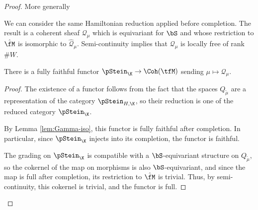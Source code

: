 \begin{proof}
More generally

We can consider the same Hamiltonian reduction applied before completion.  The result is a coherent sheaf ${\mathcal{Q}}_\mu$ which is equivariant for $\bS$ and whose restriction to $\hat{\fM}$ is isomorphic to $\hat{\mathcal{Q}}_\mu$.  Semi-continuity implies that ${\mathcal{Q}}_\mu$ is locally free of rank $\#W$.

\begin{lemma}\label{lem:pStein-fully-faithful}
  There is a fully faithful functor $\pStein_\K\to \Coh(\tfM)$ sending $\mu\mapsto {\mathcal{Q}}_\mu$.  
\end{lemma}
\begin{proof}
  The existence of a functor follows from the fact that the spaces ${Q}_{\tilde{\mu}}$ are a representation of the category ${\pStein}_{H,\K}$, so their reduction is one of the reduced category ${\pStein}_{\K}$.  
  
  By Lemma \ref{lem:Gamma-iso}, this functor is fully faithful after completion.  In particular, since $\pStein_\K$ injects into its completion, the functor is faithful.
  
  The grading on ${\pStein}_{\K}$ is compatible with a $\bS$-equivariant structure on ${Q}_{\tilde{\mu}}$, so the cokernel of the map on morphisms is also $\bS$-equivariant, and since the map is full after completion, its restriction to $\hat{\fM}$ is trivial.  Thus, by semi-continuity, this cokernel is trivial, and the functor is full. 
\end{proof}


\end{proof}
